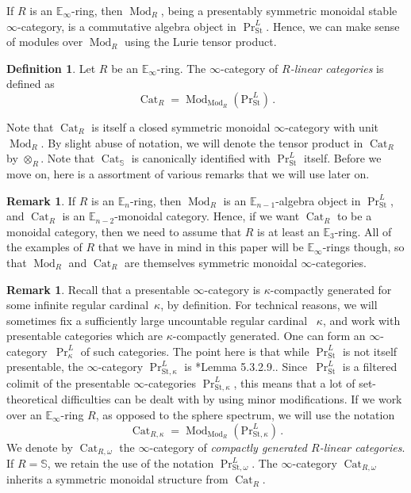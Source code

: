 \documentclass[10pt]{amsart}
\theoremstyle{plain}
\theoremstyle{definition}
\newtheorem{definition}[theorem]{Definition}
\newtheorem{rmk}[theorem]{Remark}
\DeclareMathOperator{\Mod}{Mod}
\DeclareMathOperator{\Ind}{Ind}
\DeclareMathOperator{\Cat}{Cat}
\newcommand{\St}{\mathrm{St}}
\newcommand{\oop}{\mathrm{op}}
\newcommand{\bE}{\mathbb{E}}
\newcommand{\bS}{\mathbb{S}}
\newcommand{\cC}{\mathcal{C}}
\begin{document}
If $R$ is an $\bE_\infty$-ring, then $\Mod_R$, being a presentably symmetric monoidal stable $\infty$-category, is a commutative algebra object in $\Pr^{L}_{\St}$.
Hence, we can make sense of modules over $\Mod_R$ using the Lurie tensor product.

\begin{definition}
  Let $R$ be an $\bE_\infty$-ring. The $\infty$-category of \emph{$R$-linear categories} is defined as
  \[
  \Cat_R = \Mod_{\Mod_R}\left(\mathrm{Pr}^{L}_{\St}\right) \,.
  \]
\end{definition}

Note that $\Cat_R$ is itself a closed symmetric monoidal $\infty$-category with unit $\Mod_R$. By slight abuse of notation, we will denote the tensor product in $\Cat_R$ by $\otimes_R$.
Note that $\Cat_{\bS}$ is canonically identified with $\Pr^{L}_{\St}$ itself.
Before we move on, here is a assortment of various remarks that we will use later on.

\begin{rmk}
  If $R$ is an $\bE_n$-ring, then $\Mod_R$ is an $\bE_{n-1}$-algebra object in $\Pr^{L}_{\St}$, and $\Cat_R$ is an $\bE_{n-2}$-monoidal category.
  Hence, if we want $\Cat_R$ to be a monoidal category, then we need to assume that $R$ is at least an $\bE_3$-ring.
  All of the examples of $R$ that we have in mind in this paper will be $\bE_\infty$-rings though, so that $\Mod_R$ and $\Cat_R$ are themselves symmetric monoidal $\infty$-categories.
\end{rmk}

\begin{rmk}
 Recall that a presentable $\infty$-category is $\kappa$-compactly generated for some infinite regular cardinal~$\kappa$, by definition.
 For technical reasons, we will sometimes fix a sufficiently large uncountable regular cardinal ~$\kappa$, and work with presentable categories which are $\kappa$-compactly generated.
 One can form an $\infty$-category~$\Pr^{L}_{\kappa}$ of such categories.
 The point here is that while $\Pr^{L}_{\St}$ is not itself presentable, the $\infty$-category $\Pr^{L}_{\St,\kappa}$ is \cite{HA}*{Lemma 5.3.2.9.}.
 Since~$\Pr^L_{\St}$ is a filtered colimit of the presentable $\infty$-categories $\Pr_{\St,\kappa}^{L}$, this means that a lot of set-theoretical difficulties can be dealt with by using minor modifications.
 If we work over an $\bE_\infty$-ring $R$, as opposed to the sphere spectrum, we will use the notation
\[
\Cat_{R,\kappa} = \Mod_{\Mod_R}(\mathrm{Pr}^{L}_{\St,\kappa}) \,.
\]
We denote by $\Cat_{R, \omega}$ the $\infty$-category of \emph{compactly generated $R$-linear categories}.
If $R= \bS$, we retain the use of the notation $\Pr^{L}_{\St, \omega}$.
The $\infty$-category $\Cat_{R, \omega}$ inherits a symmetric monoidal structure from $\Cat_R$.
\end{rmk}
\end{document}
